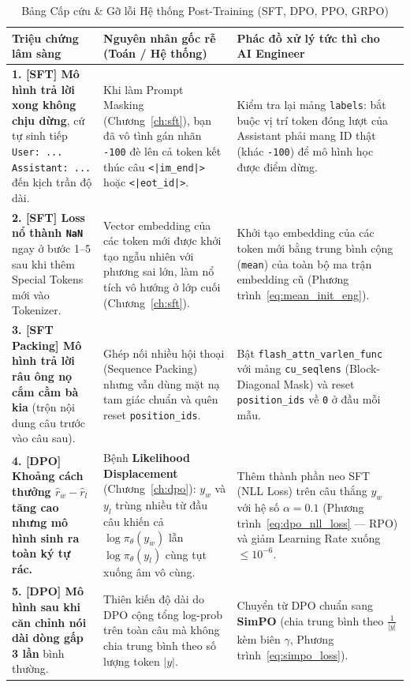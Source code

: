 \begin{table}[htbp]
\centering
\caption{Bảng Cấp cứu \& Gỡ lỗi Hệ thống Post-Training (SFT, DPO, PPO, GRPO)}
\label{tab:troubleshooting_playbook}
\renewcommand{\arraystretch}{1.38}
\footnotesize
\begin{tabularx}{\textwidth}{p{3.4cm} p{4.5cm} X}
\toprule
\textbf{Triệu chứng lâm sàng} & \textbf{Nguyên nhân gốc rễ (Toán / Hệ thống)} & \textbf{Phác đồ xử lý tức thì cho AI Engineer} \\
\midrule
\textbf{1. [SFT] Mô hình trả lời xong không chịu dừng}, cứ tự sinh tiếp \texttt{User: ... Assistant: ...} đến kịch trần độ dài. & Khi làm Prompt Masking (Chương~\ref{ch:sft}), bạn đã vô tình gán nhãn \texttt{-100} đè lên cả token kết thúc câu \texttt{<|im\_end|>} hoặc \texttt{<|eot\_id|>}. & Kiểm tra lại mảng \texttt{labels}: bắt buộc vị trí token đóng lượt của Assistant phải mang ID thật (khác \texttt{-100}) để mô hình học được điểm dừng. \\
\addlinespace
\textbf{2. [SFT] Loss nổ thành \texttt{NaN}} ngay ở bước 1--5 sau khi thêm Special Tokens mới vào Tokenizer. & Vector embedding của các token mới được khởi tạo ngẫu nhiên với phương sai lớn, làm nổ tích vô hướng ở lớp cuối (Chương~\ref{ch:sft}). & Khởi tạo embedding của các token mới bằng trung bình cộng (\texttt{mean}) của toàn bộ ma trận embedding cũ (Phương trình~\ref{eq:mean_init_eng}). \\
\addlinespace
\textbf{3. [SFT Packing] Mô hình trả lời râu ông nọ cắm cằm bà kia} (trộn nội dung câu trước vào câu sau). & Ghép nối nhiều hội thoại (Sequence Packing) nhưng vẫn dùng mặt nạ tam giác chuẩn và quên reset \texttt{position\_ids}. & Bật \texttt{flash\_attn\_varlen\_func} với mảng \texttt{cu\_seqlens} (Block-Diagonal Mask) và reset \texttt{position\_ids} về \texttt{0} ở đầu mỗi mẫu. \\
\addlinespace
\textbf{4. [DPO] Khoảng cách thưởng $\hat{r}_w - \hat{r}_l$ tăng cao nhưng mô hình sinh ra toàn ký tự rác.} & Bệnh \textbf{Likelihood Displacement} (Chương~\ref{ch:dpo}): $y_w$ và $y_l$ trùng nhiều từ đầu câu khiến cả $\log \pi_\theta(y_w)$ lẫn $\log \pi_\theta(y_l)$ cùng tụt xuống âm vô cùng. & Thêm thành phần neo SFT (NLL Loss) trên câu thắng $y_w$ với hệ số $\alpha = 0.1$ (Phương trình~\ref{eq:dpo_nll_loss} --- RPO) và giảm Learning Rate xuống $\le 10^{-6}$. \\
\addlinespace
\textbf{5. [DPO] Mô hình sau khi căn chỉnh nói dài dòng gấp 3 lần} bình thường. & Thiên kiến độ dài do DPO cộng tổng log-prob trên toàn câu mà không chia trung bình theo số lượng token $|y|$. & Chuyển từ DPO chuẩn sang \textbf{SimPO} \citep{meng2024simpo} (chia trung bình theo $\frac{1}{|y|}$ kèm biên $\gamma$, Phương trình~\ref{eq:simpo_loss}). \\

\end{tabularx}
\end{table}
